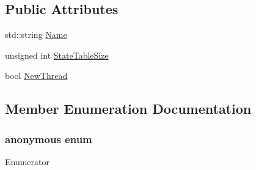 \subsection*{Public Attributes}
\begin{DoxyCompactItemize}
\item 
std\+::string \hyperlink{classmts_task_continuous_constructor_arg_a93d1c4dea258e4b415ecfc0d4a82d379}{Name}
\item 
unsigned int \hyperlink{classmts_task_continuous_constructor_arg_a45645886b95b25b5727488c7d335b2cf}{State\+Table\+Size}
\item 
bool \hyperlink{classmts_task_continuous_constructor_arg_aa49a5e6b6c0d56a38a87419604a40210}{New\+Thread}
\end{DoxyCompactItemize}


\subsection{Member Enumeration Documentation}
\hypertarget{classmts_task_continuous_constructor_arg_a45f2bdbbc5675e56493c3ae482366eb2}{}\subsubsection[{anonymous enum}]{\setlength{\rightskip}{0pt plus 5cm}anonymous enum}\label{classmts_task_continuous_constructor_arg_a45f2bdbbc5675e56493c3ae482366eb2}
\begin{Desc}
\item[Enumerator]\par
\begin{description}
\item[{\em 
\hypertarget{classmts_task_continuous_constructor_arg_a45f2bdbbc5675e56493c3ae482366eb2aa445b554da5472573538670101b0cc34}{}S\+T\+A\+T\+E\+\_\+\+T\+A\+B\+L\+E\+\_\+\+D\+E\+F\+A\+U\+L\+T\+\_\+\+S\+I\+Z\+E\label{classmts_task_continuous_constructor_arg_a45f2bdbbc5675e56493c3ae482366eb2aa445b554da5472573538670101b0cc34}
}]\end{description}
\end{Desc}


